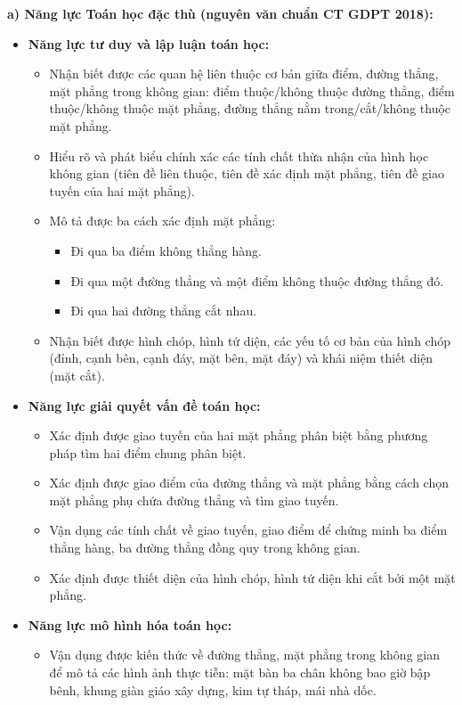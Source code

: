 \documentclass[12pt, a4paper]{article}
\begin{document}
\textbf{a) Năng lực Toán học đặc thù (nguyên văn chuẩn CT GDPT 2018):}
\begin{itemize}[leftmargin=1.5em]
    \item \textbf{Năng lực tư duy và lập luận toán học:}
    \begin{itemize}
        \item Nhận biết được các quan hệ liên thuộc cơ bản giữa điểm, đường thẳng, mặt phẳng trong không gian: điểm thuộc/không thuộc đường thẳng, điểm thuộc/không thuộc mặt phẳng, đường thẳng nằm trong/cắt/không thuộc mặt phẳng.
        \item Hiểu rõ và phát biểu chính xác các tính chất thừa nhận của hình học không gian (tiên đề liên thuộc, tiên đề xác định mặt phẳng, tiên đề giao tuyến của hai mặt phẳng).
        \item Mô tả được ba cách xác định mặt phẳng:
        \begin{itemize}
            \item Đi qua ba điểm không thẳng hàng.
            \item Đi qua một đường thẳng và một điểm không thuộc đường thẳng đó.
            \item Đi qua hai đường thẳng cắt nhau.
        \end{itemize}
        \item Nhận biết được hình chóp, hình tứ diện, các yếu tố cơ bản của hình chóp (đỉnh, cạnh bên, cạnh đáy, mặt bên, mặt đáy) và khái niệm thiết diện (mặt cắt).
    \end{itemize}
    \item \textbf{Năng lực giải quyết vấn đề toán học:}
    \begin{itemize}
        \item Xác định được giao tuyến của hai mặt phẳng phân biệt bằng phương pháp tìm hai điểm chung phân biệt.
        \item Xác định được giao điểm của đường thẳng và mặt phẳng bằng cách chọn mặt phẳng phụ chứa đường thẳng và tìm giao tuyến.
        \item Vận dụng các tính chất về giao tuyến, giao điểm để chứng minh ba điểm thẳng hàng, ba đường thẳng đồng quy trong không gian.
        \item Xác định được thiết diện của hình chóp, hình tứ diện khi cắt bởi một mặt phẳng.
    \end{itemize}
    \item \textbf{Năng lực mô hình hóa toán học:}
    \begin{itemize}
        \item Vận dụng được kiến thức về đường thẳng, mặt phẳng trong không gian để mô tả các hình ảnh thực tiễn: mặt bàn ba chân không bao giờ bập bênh, khung giàn giáo xây dựng, kim tự tháp, mái nhà dốc.

\end{itemize}
\end{itemize}
\end{document}
